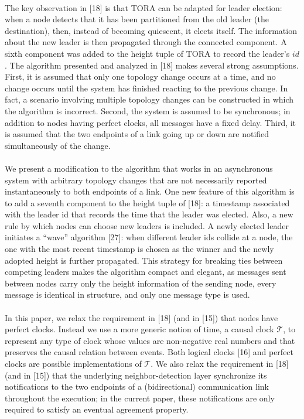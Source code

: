 \paragraph{}The key observation in [18] is that TORA can be adapted for leader election: when a node detects that it has been partitioned from the old leader (the destination), then, instead of becoming quiescent, it elects itself. The information about the new leader is then propagated through the connected component. A sixth component was added to the height tuple of TORA to record the leader’s $id$. The algorithm presented and analyzed in [18] makes several strong assumptions. First, it is assumed that only one topology change occurs at a time, and no change occurs until the system has finished reacting to the previous change. In fact, a scenario involving multiple topology changes can be constructed in which the algorithm is incorrect. Second, the system is assumed to be synchronous; in addition to nodes having perfect clocks, all messages have a fixed delay. Third, it is assumed that the two endpoints of a link going up or down are notified simultaneously of the change.
\paragraph{}We present a modification to the algorithm that works in an asynchronous system with arbitrary topology changes that are not necessarily reported instantaneously to both endpoints of a link. One new feature of this algorithm is to add a seventh component to the height tuple of [18]: a timestamp associated with the leader id that records the time that the leader was elected. Also, a new rule by which nodes can choose new leaders is included. A newly elected leader initiates a “wave” algorithm [27]: when different leader ids collide at a node, the one with the most recent timestamp is chosen as the winner and the newly adopted height is further propagated. This strategy for breaking ties between competing leaders makes the algorithm compact and elegant, as messages sent between nodes carry only the height information of the sending node, every message is identical in structure, and only one message type is used.
\paragraph{}In this paper, we relax the requirement in [18] (and in [15]) that nodes have perfect clocks. Instead we use a more generic notion of time, a causal clock $\mathcal{T}$, to represent any type of clock whose values are non-negative real numbers and that preserves the causal relation between events. Both logical clocks [16] and perfect clocks are possible implementations of $\mathcal{T}$. We also relax the requirement in [18] (and in [15]) that the underlying neighbor-detection layer synchronize its notifications to the two endpoints of a (bidirectional) communication link throughout the execution; in the current paper, these notifications are only required to satisfy an eventual agreement property.
